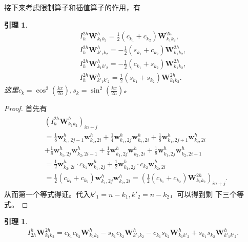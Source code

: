 \documentclass[a4paper,twoside]{ctexart}
\newtheorem{lemma}[definition]{引理}
\begin{document}
接下来考虑限制算子和插值算子的作用，有
\begin{lemma}
  \begin{eqnarray}
    I_h^{2h}\mathbf{W}_{k_1 k_2}^h = \frac{1}{2}(c_{k_1}+c_{k_2})\mathbf{W}_{k_1 k_2}^{2h},\\
    I_h^{2h}\mathbf{W}_{k'_1 k_2}^h = -\frac{1}{2}(s_{k_1}+c_{k_2})\mathbf{W}_{k_1 k_2}^{2h},\\
    I_h^{2h}\mathbf{W}_{k_1 k'_2}^h = -\frac{1}{2}(c_{k_1}+s_{k_2})\mathbf{W}_{k_1 k_2}^{2h},\\
    I_h^{2h}\mathbf{W}_{k'_1 k'_2}^h = \frac{1}{2}(s_{k_1}+s_{k_2})\mathbf{W}_{k_1 k_2}^{2h}.
  \end{eqnarray}
  这里$c_k = \cos^2(\frac{k\pi}{2n}), s_k = \sin^2(\frac{k\pi}{2n})$。
\end{lemma}
\begin{proof}
  首先有
  \begin{eqnarray}
    \begin{aligned}
      &\left(I_h^{2h}\mathbf{W}_{k_1 k_2}^h\right)_{in+j} \\
      &=\frac{1}{8}\mathbf{w}_{k_1,2j-1}^h\mathbf{w}_{k_2,2i}^h+\frac{1}{4}\mathbf{w}_{k_1,2j}^h\mathbf{w}_{k_2,2i}^h+\frac{1}{8}\mathbf{w}_{k_1,2j+1}^h\mathbf{w}_{k_2,2i}^h\\
      & +\frac{1}{8}\mathbf{w}_{k_1,2j}^h\mathbf{w}_{k_2,2i-1}^h+\frac{1}{4}\mathbf{w}_{k_1,2j}^h\mathbf{w}_{k_2,2i}^h+\frac{1}{8}\mathbf{w}_{k_1,2j}^h\mathbf{w}_{k_2,2i+1}^h\\
      &= \frac{1}{2}\mathbf{w}_{k_2,2i}^h\cdot
      c_{k_1}\mathbf{w}_{k_1,2j}^h+\frac{1}{2}\mathbf{w}_{k_1,2j}^h\cdot
      c_{k_2}\mathbf{w}_{k_2,2i}^h\\
      &=\frac{1}{2}(c_{k_1}+c_{k_2})\mathbf{w}_{k_1,2j}^h\mathbf{w}_{k_2,2i}^h = \left(\frac{1}{2}(c_{k_1}+c_{k_2})\mathbf{W}_{k_1 k_2}^{2h}\right)_{in+j}.
    \end{aligned}
  \end{eqnarray}
  从而第一个等式得证。代入$k'_1 = n - k_1, k'_2 = n - k_2$，可以得到剩
  下三个等式。
\end{proof}
  \begin{lemma}
    \begin{eqnarray}
      I_{2h}^h\mathbf{W}_{k_1 k_2}^{2h} = c_{k_1}c_{k_2}\mathbf{W}_{k_1 k_2}^{h}-s_{k_1}c_{k_2}\mathbf{W}_{k'_1 k_2}^h-c_{k_1}s_{k_2}\mathbf{W}_{k_1 k'_2}^h+s_{k_1}s_{k_2}\mathbf{W}_{k'_1 k'_2}^h.
    \end{eqnarray}

  \end{lemma}
\end{document}
